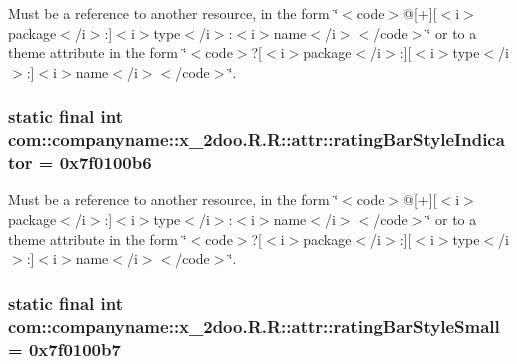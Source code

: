 Must be a reference to another resource, in the form \char`\"{}$<$code$>$@\mbox{[}+\mbox{]}\mbox{[}$<$i$>$package$<$/i$>$:\mbox{]}$<$i$>$type$<$/i$>$:$<$i$>$name$<$/i$>$$<$/code$>$\char`\"{} or to a theme attribute in the form \char`\"{}$<$code$>$?\mbox{[}$<$i$>$package$<$/i$>$:\mbox{]}\mbox{[}$<$i$>$type$<$/i$>$:\mbox{]}$<$i$>$name$<$/i$>$$<$/code$>$\char`\"{}. \hypertarget{classcom_1_1companyname_1_1x__2doo_1_1_r_1_1attr_16b27dcf0ce3da3e079dedb114df7aa7}{
\subsubsection[{ratingBarStyleIndicator}]{\setlength{\rightskip}{0pt plus 5cm}static final int com::companyname::x\_\-2doo.R.R::attr::ratingBarStyleIndicator = 0x7f0100b6}}
\label{classcom_1_1companyname_1_1x__2doo_1_1_r_1_1attr_16b27dcf0ce3da3e079dedb114df7aa7}


Must be a reference to another resource, in the form \char`\"{}$<$code$>$@\mbox{[}+\mbox{]}\mbox{[}$<$i$>$package$<$/i$>$:\mbox{]}$<$i$>$type$<$/i$>$:$<$i$>$name$<$/i$>$$<$/code$>$\char`\"{} or to a theme attribute in the form \char`\"{}$<$code$>$?\mbox{[}$<$i$>$package$<$/i$>$:\mbox{]}\mbox{[}$<$i$>$type$<$/i$>$:\mbox{]}$<$i$>$name$<$/i$>$$<$/code$>$\char`\"{}. \hypertarget{classcom_1_1companyname_1_1x__2doo_1_1_r_1_1attr_30b34833def57985801157eacfd32759}{
\subsubsection[{ratingBarStyleSmall}]{\setlength{\rightskip}{0pt plus 5cm}static final int com::companyname::x\_\-2doo.R.R::attr::ratingBarStyleSmall = 0x7f0100b7}}
\label{classcom_1_1companyname_1_1x__2doo_1_1_r_1_1attr_30b34833def57985801157eacfd32759}


